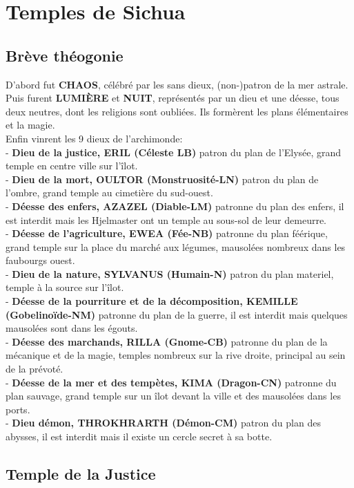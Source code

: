 \section{Temples de Sichua}

\subsection{Brève théogonie}
D'abord fut {\bf CHAOS}, célébré par les sans dieux, (non-)patron de la mer astrale. \\
Puis furent {\bf LUMIÈRE} et {\bf NUIT}, représentés par un dieu et une déesse, tous deux neutres, dont les religions sont oubliées. Ils formèrent les plans élémentaires et la magie.\\
Enfin vinrent les 9 dieux de l'archimonde: \\
- {\bf Dieu de la justice, ERIL (Céleste LB)} patron du plan de l'Elysée, grand temple en centre ville sur l'îlot. \\
- {\bf Dieu de la mort, OULTOR (Monstruosité-LN)} patron du plan de l'ombre, grand temple au cimetière du sud-ouest. \\
- {\bf Déesse des enfers, AZAZEL (Diable-LM)} patronne du plan des enfers, il est interdit mais les Hjelmaster ont un temple au sous-sol de leur demeurre. \\
- {\bf Déesse de l'agriculture, EWEA (Fée-NB)} patronne du plan féérique, grand temple sur la place du marché aux légumes, mausolées nombreux dans les faubourgs ouest. \\
- {\bf Dieu de la nature, SYLVANUS (Humain-N)} patron du plan materiel, temple à la source sur l'îlot. \\
- {\bf Déesse de la pourriture et de la décomposition, KEMILLE (Gobelinoïde-NM)} patronne du plan de la guerre, il est interdit mais quelques mausolées sont dans les égouts. \\
- {\bf Déesse des marchands, RILLA (Gnome-CB)} patronne du plan de la mécanique et de la magie, temples nombreux sur la rive droite, principal au sein de la prévoté. \\
- {\bf Déesse de la mer et des tempètes, KIMA (Dragon-CN)} patronne du plan sauvage, grand temple sur un îlot devant la ville et des mausolées dans les ports. \\
- {\bf Dieu démon, THROKHRARTH (Démon-CM)} patron du plan des abysses, il est interdit mais il existe un cercle secret à sa botte. \\

\subsection{Temple de la Justice}

